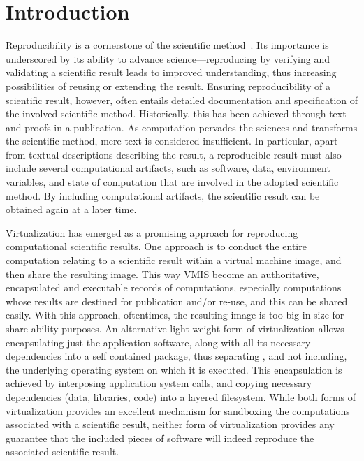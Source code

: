 \section{Introduction}

Reproducibility is a cornerstone of the scientific method~\cite{borgman2012data}. 
Its importance is underscored by its ability to advance science---reproducing by verifying and validating a scientific result leads to improved understanding, thus increasing possibilities of reusing or extending the result. 
Ensuring reproducibility of a scientific result, however, often entails detailed documentation and specification of the involved scientific method. Historically, this has been achieved through text and proofs in a publication. 
As computation pervades the sciences and transforms the scientific method, mere text is considered insufficient. 
In particular, apart from textual descriptions describing the result, a reproducible result must also include several computational artifacts, such as software, data,  environment variables, and state of computation that are involved in the adopted scientific method.  By including computational artifacts, the scientific result can be obtained again at a later time. 

Virtualization has emerged as a promising approach for reproducing computational scientific results. One approach is to conduct the entire computation relating to a scientific result within a virtual machine image, and then share the resulting image. This way VMIS become an authoritative, encapsulated and executable records of computations, especially computations whose results are destined for publication and/or re-use, and this can be shared easily. 
With this approach, oftentimes, the resulting image is too big in size for share-ability purposes. An alternative light-weight form of virtualization allows encapsulating just the application software, along with all its necessary dependencies into a self contained package, thus separating , and not including, the underlying operating system on which it is executed. This encapsulation is achieved by interposing application system calls, and copying necessary dependencies (data, libraries, code) into a layered filesystem. While both forms of virtualization provides an excellent mechanism for sandboxing the computations associated with a scientific result, neither form of virtualization provides any guarantee that the included pieces of software will indeed reproduce the associated scientific result. 

